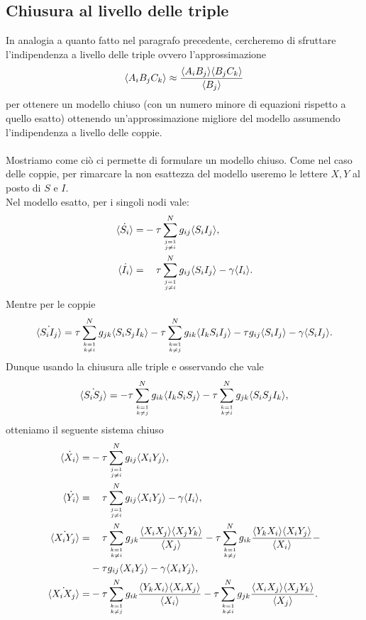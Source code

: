 \subsection{Chiusura al livello delle triple}
In analogia a quanto fatto nel paragrafo precedente, cercheremo di sfruttare l'indipendenza a livello delle triple ovvero l'approssimazione
$$ \langle  A_i B_j C_k  \rangle\approx \frac{\langle A_iB_j \rangle\langle B_jC_k \rangle}{\langle B_j \rangle}$$
 per ottenere un modello chiuso (con un numero minore di equazioni rispetto a quello esatto) ottenendo un'approssimazione migliore del modello assumendo l'indipendenza a livello delle coppie.\\ \\
Mostriamo come ci\`o ci permette di formulare un modello chiuso. Come nel caso delle coppie, per rimarcare la non esattezza del modello useremo le lettere $X,Y$ al posto di $S$ e $I$. \\
Nel  modello esatto, per i singoli nodi vale: \begin{equation*}
\begin{aligned}
	\dot{\angol{S_i}} = &-\tau \sum_{j=1\atop {j\neq i }} ^N g_{ij} \angol{S_i I_j},\\
	\dot{\angol{I_i}} = &\spa\tau \sum_{j=1\atop {j\neq i }} ^N g_{ij} \angol{S_i I_j} -\gamma \angol{I_i}.
\end{aligned}
\end{equation*}
Mentre per le coppie 
$$
\dot{\langle S_i I_j \rangle} = \tau \sum_{k=1\atop{k\neq i }}^N g_{jk} \langle S_iS_jI_k \rangle - \tau \sum_{k=1\atop{k\neq j }}^N g_{ik} \langle I_kS_iI_j \rangle - \tau  g_{ij} \langle S_i I_j \rangle  -\gamma \langle S_i I_j \rangle.
$$
Dunque usando la chiusura alle triple e osservando che vale
$$ \dot{\langle S_i S_j \rangle} = -\tau \sum_{k=1\atop{k \neq j}}^N g_{ik} \langle I_kS_iS_j \rangle - \tau \sum_{k=1\atop{k\neq i }}^N g_{jk} \langle S_iS_jI_k \rangle,$$ 
otteniamo il seguente sistema chiuso 
\begin{equation}\label{Chiuso_triple}
\begin{aligned}
		\dot{\angol{X_i}} = &-\tau \sum_{j=1\atop {j\neq i }} ^N g_{ij} \angol{X_i Y_j},\\
	\dot{\angol{Y_i}} = &\spa\tau \sum_{j=1\atop {j\neq i }} ^N g_{ij} \angol{X_i Y_j} -\gamma \angol{I_i}, \\
\dot{\angol{X_i Y_j}} =& \spa \tau \sum_{k=1\atop{k\neq i }}^N g_{jk} \frac{\angol{X_iX_j}\angol{X_jY_k}}{\angol{X_j}} - \tau \sum_{k=1\atop{k\neq j }}^N g_{ik} \frac{\angol{Y_kX_i}\angol{X_iY_j}}{\angol{X_i}}- \\
&-\tau  g_{ij} \angol{X_i Y_j}  -\gamma \angol{X_i Y_j},\\
\dot{\angol{X_i X_j}} = &-\tau \sum_{k=1\atop{k \neq j}}^N g_{ik} \frac{\angol{Y_kX_i}\angol{X_iX_j}}{\angol{X_i}} - \tau \sum_{k=1\atop{k\neq i }}^N g_{jk} \frac{\angol{X_iX_j}\angol{X_jY_k}}{\angol{X_j}}.
\end{aligned}
\end{equation} 
